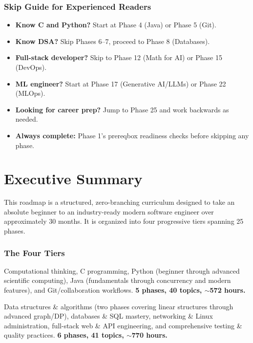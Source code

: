 \documentclass[11pt, a4paper, oneside]{report}
\begin{document}
\subsection*{Skip Guide for Experienced Readers}
\begin{itemize}[leftmargin=*]
\item \textbf{Know C and Python?} Start at Phase 4 (Java) or Phase 5 (Git).
\item \textbf{Know DSA?} Skip Phases 6--7, proceed to Phase 8 (Databases).
\item \textbf{Full-stack developer?} Skip to Phase 12 (Math for AI) or Phase 15 (DevOps).
\item \textbf{ML engineer?} Start at Phase 17 (Generative AI/LLMs) or Phase 22 (MLOps).
\item \textbf{Looking for career prep?} Jump to Phase 25 and work backwards as needed.
\item \textbf{Always complete:} Phase 1's prereqbox readiness checks before skipping any phase.
\end{itemize}

\newpage
\tableofcontents
\newpage

\chapter*{Executive Summary}

This roadmap is a structured, zero-branching curriculum designed to take an absolute beginner to an industry-ready modern software engineer over approximately 30 months. It is organized into four progressive tiers spanning 25 phases.

\subsection*{The Four Tiers}

\begin{tieroverviewbox}[title={\textbf{Tier 1: Foundations (Weeks 1--26, Phases 1--5)}}]
Computational thinking, C programming, Python (beginner through advanced scientific computing), Java (fundamentals through concurrency and modern features), and Git/collaboration workflows. \textbf{5 phases, 40 topics, $\sim$572 hours.}
\end{tieroverviewbox}

\begin{tieroverviewbox}[title={\textbf{Tier 2: Core Engineering (Weeks 27--65, Phases 6--11)}}]
Data structures \& algorithms (two phases covering linear structures through advanced graph/DP), databases \& SQL mastery, networking \& Linux administration, full-stack web \& API engineering, and comprehensive testing \& quality practices. \textbf{6 phases, 41 topics, $\sim$770 hours.}
\end{tieroverviewbox}
\end{document}

